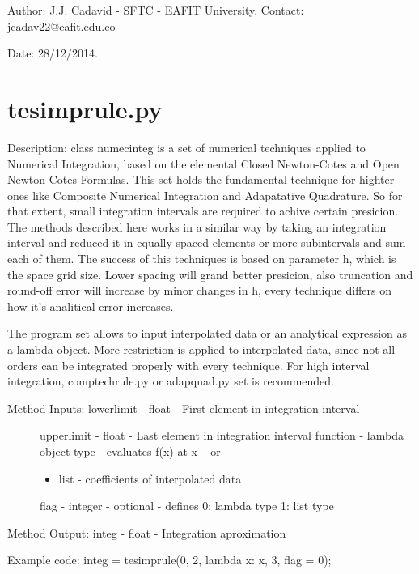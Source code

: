 \documentclass[letterpaper,10pt,oneside]{sphinxmanual}
\theoremstyle{plain}%
\theoremstyle{definition}%
\theoremstyle{remark}%
\begin{document}
Author: J.J. Cadavid - SFTC - EAFIT University.
Contact: \href{mailto:jcadav22@eafit.edu.co}{jcadav22@eafit.edu.co}

Date: 28/12/2014.


\section{tesimprule.py}
\label{code:module-tesimprule}\label{code:tesimprule-py}
Description: class numecinteg is a set of numerical techniques applied to
Numerical Integration, based on the elemental Closed Newton-Cotes and
Open Newton-Cotes Formulas. This set holds the fundamental technique for
highter ones like Composite Numerical Integration and Adapatative Quadrature.
So for that extent, small integration intervals are required to achive certain
presicion. The methods described here works in a similar way by taking an
integration interval and reduced it in equally spaced elements or more 
subintervals and sum each of them. The success of this techniques is based
on parameter h, which is the space grid size. Lower spacing will grand better
presicion, also truncation and round-off error will increase by minor changes
in h, every technique differs on how it's analitical error increases.

The program set allows to input interpolated data or an analytical expression
as a lambda object. More restriction is applied to interpolated data, since
not all orders can be integrated properly with every technique. For high 
interval integration, comptechrule.py or adapquad.py set is recommended.
\begin{description}
\item[{Method Inputs: lowerlimit - float - First element in integration interval}] \leavevmode
upperlimit - float - Last element in integration interval
function - lambda object type - evaluates f(x) at x -- or
\begin{itemize}
\item {} 
list - coefficients of interpolated data

\end{itemize}

flag - integer - optional - defines 0: lambda type 1: list type

\end{description}

Method Output: integ - float - Integration aproximation

Example code: integ = tesimprule(0, 2, lambda x: x, 3, flag = 0);
\end{document}

